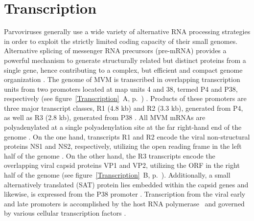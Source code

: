 \section{Transcription}
\label{Transcription1}
Parvoviruses generally use a wide variety of alternative RNA processing strategies in order to exploit the strictly limited coding capacity of their small genomes. Alternative splicing of messenger RNA precursors (pre-mRNA) provides a powerful mechanism to generate structurally related but distinct proteins from a single gene, hence contributing to a complex, but efficient and compact genome organization \cite{pmid2694943, pmid1335742}. The genome of MVM is transcribed in overlapping transcription units from two promoters located at map units 4 and 38, termed P4 and P38, respectively (see figure~\ref{Transcription}~A, p.~\pageref{Transcription}) \cite{pmid6828378}. Products of these promoters are three major transcript classes, R1 (4.8 kb) and R2 (3.3 kb), generated from P4, as well as R3 (2.8 kb), generated from P38 \cite{pmid3951017}. All MVM mRNAs are polyadenylated at a single polyadenylation site at the far right-hand end of the genome \cite{pmid3660591, pmid3502703}. On the one hand, transcripts R1 and R2 encode the viral non-structural proteins NS1 and NS2, respectively, utilizing the open reading frame in the left half of the genome \cite{pmid2939261}. On the other hand, the R3 transcripts encode the overlapping viral capsid proteins VP1 and VP2, utilizing the ORF in the right half of the genome (see figure~\ref{Transcription}~B, p.~\pageref{Transcription}). Additionally, a small alternatively translated (SAT) protein lies embedded within the capsid genes and likewise, is expressed from the P38 promoter \cite{pmid16189014}. Transcription from the viral early and late promoters is accomplished by the host RNA polymerase~ \cite{pmid6828378, polII} and governed by various cellular transcription factors \cite{pmid2585609, pmid8009857, pmid2325201, pmid7983715, pmid1942250}. 

